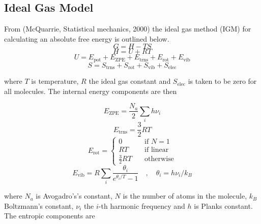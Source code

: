 \documentclass[10pt]{article}
\begin{document}
\subsection{Ideal Gas Model}

From (McQuarrie, Statistical mechanics, 2000) the ideal gas method (IGM) for calculating an absolute free energy is outlined below.
\begin{equation}
	G  = H - TS
\end{equation}
\begin{equation}
	H = U + RT
\end{equation}
\begin{equation}
	U = E_\text{pot} + E_\text{ZPE} + E_\text{trns} + E_\text{rot} + E_\text{vib} \end{equation}
\begin{equation}
	S = S_\text{trns} + S_\text{rot} + S_\text{vib} + S_\text{elec}
\end{equation}

where $T$ is temperature, $R$ the ideal gas constant and $S_\text{elec}$ is taken to be zero for all molecules. The internal energy components are then

\begin{equation}
	E_\text{ZPE} = \frac{N_a}{2}\sum_i h \nu_i
\end{equation}
\begin{equation}
	E_\text{trns} = \frac{3}{2}RT
\end{equation}
\begin{equation}
	E_\text{rot} =
	\begin{cases}
		0 &\quad \text{if  } N = 1 \\
		RT &\quad \text{if linear} \\
		\frac{3}{2} RT &\quad \text{otherwise}
	\end{cases}
\end{equation}
\begin{equation}
	E_\text{vib} = R \sum_i \frac{\theta_i}{e^{\theta_i / T} - 1} \quad ,\quad \theta_i = h\nu_i / k_B
\end{equation}

where $N_a$ is Avogadro's's constant, $N$ is the number of atoms in the molecule, $k_B$ Boltzmann's constant, $ \nu_i$ the $i$-th harmonic frequency and $h$ is Planks constant. The entropic components are
\end{document}
